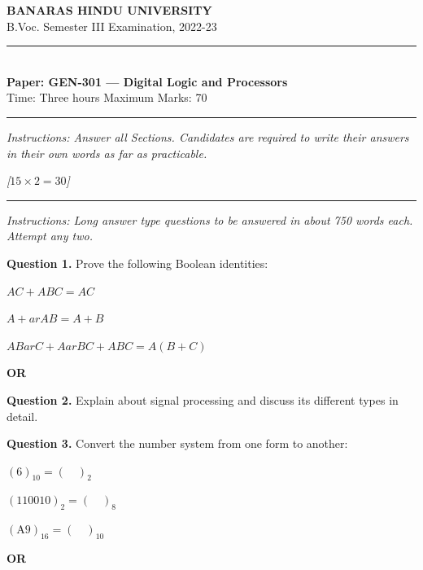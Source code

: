 \documentclass[11pt,a4paper]{article}
\newcommand{\pts}[1]{\hfill   \textit{[#1]}}
\begin{document}
\begin{center}
  {\large\bfseries BANARAS HINDU UNIVERSITY}\\[2pt]
  {
\normalsize B.Voc. Semester III Examination, 2022-23}\\[6pt]
  \rule{0.8\linewidth}{0.5pt}\\[6pt]
  {\large\bfseries Paper: GEN-301 --- Digital Logic and Processors}\\[4pt]
  {
\normalsize Time: Three hours \hfill Maximum Marks: 70}
\end{center}

\rule{\linewidth}{0.4pt}

\smallskip



\noindent   \textit{Instructions: Answer all Sections. Candidates are required to write their answers in their own words as far as practicable.}

\bigskip

\bigskip


\pts{$15  \times 2 = 30$}
\rule{\linewidth}{0.4pt}\smallskip




\noindent   \textit{Instructions: Long answer type questions to be answered in about 750 words each. Attempt any two.}

\medskip


\noindent   \textbf{Question 1.} Prove the following Boolean identities:

\begin{parts}
  \item $A C + A B C = A C$
  \item $A + ar{A} B = A + B$
  \item $A B ar{C} + A ar{B} C + A B C = A(B + C)$
\end{parts}
\centerline{   \textbf{OR}}

\medskip


\noindent   \textbf{Question 2.} Explain about signal processing and discuss its different types in detail.

\medskip


\noindent   \textbf{Question 3.} Convert the number system from one form to another:

\begin{parts}
  \item $(6)_{10} = ( \quad )_2$
  \item $(110010)_2 = ( \quad )_8$
  \item $( \text{A9})_{16} = ( \quad )_{10}$
\end{parts}
\centerline{   \textbf{OR}}
\end{document}

